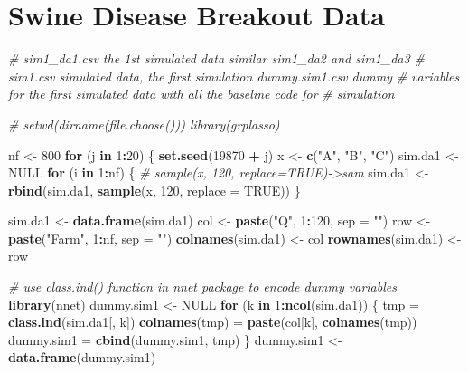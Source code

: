 \documentclass[12pt,]{krantz}
\makeatletter
\newenvironment{Shaded}{\begin{snugshade}}{\end{snugshade}}
\newcommand{\CommentTok}[1]{\textcolor[rgb]{0.37,0.37,0.37}{\textit{#1}}}
\newcommand{\ControlFlowTok}[1]{\textcolor[rgb]{0.27,0.27,0.27}{\textbf{#1}}}
\newcommand{\DataTypeTok}[1]{\textcolor[rgb]{0.27,0.27,0.27}{#1}}
\newcommand{\DecValTok}[1]{\textcolor[rgb]{0.06,0.06,0.06}{#1}}
\newcommand{\KeywordTok}[1]{\textcolor[rgb]{0.27,0.27,0.27}{\textbf{#1}}}
\newcommand{\NormalTok}[1]{#1}
\newcommand{\OperatorTok}[1]{\textcolor[rgb]{0.43,0.43,0.43}{\textbf{#1}}}
\newcommand{\OtherTok}[1]{\textcolor[rgb]{0.37,0.37,0.37}{#1}}
\newcommand{\StringTok}[1]{\textcolor[rgb]{0.5,0.5,0.5}{#1}}
\newenvironment{kframe}{%
\medskip{}
\setlength{\fboxsep}{.8em}
 \def\at@end@of@kframe{}%
 \ifinner\ifhmode%
  \def\at@end@of@kframe{\end{minipage}}%
  \begin{minipage}{\columnwidth}%
 \fi\fi%
 \def\FrameCommand##1{\hskip\@totalleftmargin \hskip-\fboxsep
 \colorbox{shadecolor}{##1}\hskip-\fboxsep
     \hskip-\linewidth \hskip-\@totalleftmargin \hskip\columnwidth}%
 \MakeFramed {\advance\hsize-\width
   \@totalleftmargin\z@ \linewidth\hsize
   \@setminipage}}%
 {\par\unskip\endMakeFramed%
 \at@end@of@kframe}
\renewenvironment{Shaded}{\begin{kframe}}{\end{kframe}}
\makeatother
\begin{document}
\hypertarget{swine-disease-breakout-data-1}{%
\section{Swine Disease Breakout Data}\label{swine-disease-breakout-data-1}}

\begin{Shaded}
\begin{Highlighting}[]
\CommentTok{# sim1_da1.csv the 1st simulated data similar sim1_da2 and sim1_da3}
\CommentTok{# sim1.csv simulated data, the first simulation dummy.sim1.csv dummy}
\CommentTok{# variables for the first simulated data with all the baseline code for}
\CommentTok{# simulation}

\CommentTok{# setwd(dirname(file.choose())) library(grplasso)}

\NormalTok{nf <-}\StringTok{ }\DecValTok{800}
\ControlFlowTok{for}\NormalTok{ (j }\ControlFlowTok{in} \DecValTok{1}\OperatorTok{:}\DecValTok{20}\NormalTok{) \{}
    \KeywordTok{set.seed}\NormalTok{(}\DecValTok{19870} \OperatorTok{+}\StringTok{ }\NormalTok{j)}
\NormalTok{    x <-}\StringTok{ }\KeywordTok{c}\NormalTok{(}\StringTok{"A"}\NormalTok{, }\StringTok{"B"}\NormalTok{, }\StringTok{"C"}\NormalTok{)}
\NormalTok{    sim.da1 <-}\StringTok{ }\OtherTok{NULL}
    \ControlFlowTok{for}\NormalTok{ (i }\ControlFlowTok{in} \DecValTok{1}\OperatorTok{:}\NormalTok{nf) \{}
        \CommentTok{# sample(x, 120, replace=TRUE)->sam}
\NormalTok{        sim.da1 <-}\StringTok{ }\KeywordTok{rbind}\NormalTok{(sim.da1, }\KeywordTok{sample}\NormalTok{(x, }\DecValTok{120}\NormalTok{, }\DataTypeTok{replace =} \OtherTok{TRUE}\NormalTok{))}
\NormalTok{    \}}
    
\NormalTok{    sim.da1 <-}\StringTok{ }\KeywordTok{data.frame}\NormalTok{(sim.da1)}
\NormalTok{    col <-}\StringTok{ }\KeywordTok{paste}\NormalTok{(}\StringTok{"Q"}\NormalTok{, }\DecValTok{1}\OperatorTok{:}\DecValTok{120}\NormalTok{, }\DataTypeTok{sep =} \StringTok{""}\NormalTok{)}
\NormalTok{    row <-}\StringTok{ }\KeywordTok{paste}\NormalTok{(}\StringTok{"Farm"}\NormalTok{, }\DecValTok{1}\OperatorTok{:}\NormalTok{nf, }\DataTypeTok{sep =} \StringTok{""}\NormalTok{)}
    \KeywordTok{colnames}\NormalTok{(sim.da1) <-}\StringTok{ }\NormalTok{col}
    \KeywordTok{rownames}\NormalTok{(sim.da1) <-}\StringTok{ }\NormalTok{row}
    
    \CommentTok{# use class.ind() function in nnet package to encode dummy variables}
    \KeywordTok{library}\NormalTok{(nnet)}
\NormalTok{    dummy.sim1 <-}\StringTok{ }\OtherTok{NULL}
    \ControlFlowTok{for}\NormalTok{ (k }\ControlFlowTok{in} \DecValTok{1}\OperatorTok{:}\KeywordTok{ncol}\NormalTok{(sim.da1)) \{}
\NormalTok{        tmp =}\StringTok{ }\KeywordTok{class.ind}\NormalTok{(sim.da1[, k])}
        \KeywordTok{colnames}\NormalTok{(tmp) =}\StringTok{ }\KeywordTok{paste}\NormalTok{(col[k], }\KeywordTok{colnames}\NormalTok{(tmp))}
\NormalTok{        dummy.sim1 =}\StringTok{ }\KeywordTok{cbind}\NormalTok{(dummy.sim1, tmp)}
\NormalTok{    \}}
\NormalTok{    dummy.sim1 <-}\StringTok{ }\KeywordTok{data.frame}\NormalTok{(dummy.sim1)}
    

\end{Highlighting}
\end{Shaded}
\end{document}
